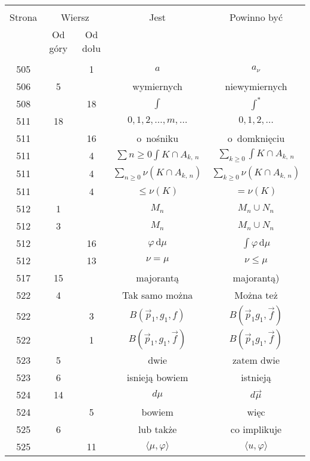\documentclass[a4paper]{article}
\newcommand{\mr}{\mathrm}
\newcommand{\de}{\mr{d}}
\newcommand{\Sum}{\sum\limits}
\newcommand{\IntL}{\int\limits}
\newcommand{\vp}{\varphi}
\newcommand{\ld}{\ldots}
\begin{document}
\begin{center}
  \begin{tabular}{|c|c|c|c|c|}
    \hline
    & \multicolumn{2}{c|}{} & & \\
    Strona & \multicolumn{2}{c|}{Wiersz}& Jest & Powinno być \\ \cline{2-3}
    & Od góry & Od dołu &  &  \\ \hline
    & & & & \\
    505 & & 1 & $a$ & $a_{ \nu }$ \\
    506 & 5 & & wymiernych & niewymiernych \\
    508 & & 18 & $\int$ & $\int^{ * }$ \\
    511 & 18 & & $0, 1, 2, \ld, m, \ld$ & $0, 1, 2, \ld$ \\
    511 & & 16 & o~nośniku & o~domknięciu \\
    511 & & 4 & $\Sum{ n \geq 0 } \IntL{ K \cap A_{ k,\, n } }$
           & $\Sum_{ k \geq 0 } \IntL{ K \cap A_{ k,\, n } }$ \\
    511 & & 4 & $\Sum_{ n \geq 0 } \nu( K \cap A_{ k,\, n } )$
           & $\Sum_{ k \geq 0 } \nu( K \cap A_{ k,\, n } )$ \\
    511 & & 4 & $\leq \nu( K )$ & $= \nu( K )$ \\
    512 & 1 & & $M_{ n }$ & $M_{ n } \cup N_{ n }$ \\
    512 & 3 & & $M_{ n }$ & $M_{ n } \cup N_{ n }$ \\
    512 & & 16 & $\vp\, \de \mu$ & $\int \vp\, \de \mu$ \\
    512 & & 13 & $\nu = \mu$ & $\nu \leq \mu$ \\
    517 & 15 & & majorantą & majorantą) \\
    522 & 4 & & Tak samo można & Można też \\
    522 & & 3 & $B( \vec{ p }_{ 1 }, g_{ 1 }, f )$
           & $B( \vec{ p }_{ 1 } g_{ 1 }, \vec{ f } )$ \\
    522 & & 1 & $B( \vec{ p }_{ 1 }, g_{ 1 }, \vec{ f } )$
           & $B( \vec{ p }_{ 1 } g_{ 1 }, \vec{ f } )$ \\
    523 & 5 & & dwie & zatem dwie \\
    523 & 6 & & isnieją bowiem & istnieją \\
    524 & 14 & & $d \mu$ & $d \vec{ \mu }$ \\
    524 & & 5 & bowiem & więc \\
    525 & 6 & & lub także & co implikuje \\
    525 & & 11 & $\langle \mu, \varphi \rangle$
           & $\langle u, \varphi \rangle$ \\

\end{tabular}
\end{center}
\end{document}
